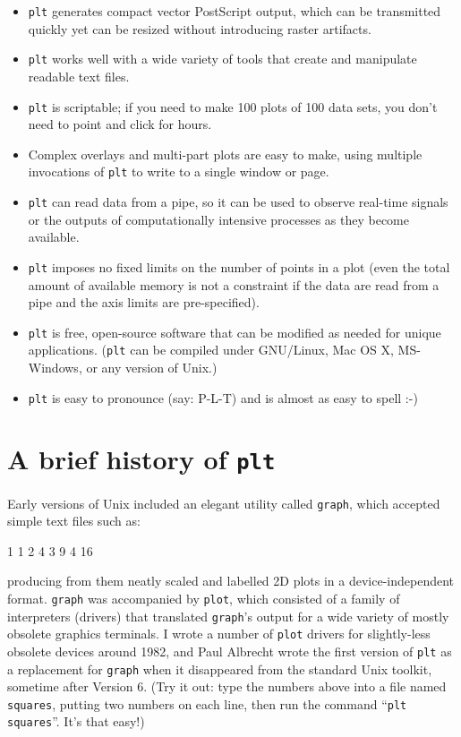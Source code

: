 \documentclass{book}
\begin{document}
\begin{itemize}
\item
{\tt plt} generates compact vector PostScript output, which can be transmitted
quickly yet can be resized without introducing raster artifacts.

\item
{\tt plt} works well with a wide variety of tools that create and
manipulate readable text files.

\item
{\tt plt} is scriptable;  if you need to make 100 plots of 100 data sets,
you don't need to point and click for hours.

\item
Complex overlays and multi-part plots are easy to make, using multiple
invocations of {\tt plt} to write to a single window or page.

\item
{\tt plt} can read data from a pipe, so it can be used to observe real-time
signals or the outputs of computationally intensive processes as they become
available.

\item
{\tt plt} imposes no fixed limits on the number of points in a plot (even
the total amount of available memory is not a constraint if the data are
read from a pipe and the axis limits are pre-specified).

\item
{\tt plt} is free, open-source software that can be modified as needed for
unique applications.  ({\tt plt} can be compiled under GNU/Linux,
Mac OS X, MS-Windows, or any version of Unix.)

\item
{\tt plt} is easy to pronounce (say: P-L-T) and is almost as easy to spell :-)
\end{itemize}

\section{A brief history of {\tt plt}}

%
%
%
%
Early versions of Unix included an elegant utility called {\tt graph}, which
accepted simple text files such as:
\begin{center}
\begin{boxedverbatim}
1 1
2 4
3 9
4 16
\end{boxedverbatim}
\end{center}
\noindent
producing from them neatly scaled and labelled 2D plots in a device-independent
format.  {\tt graph} was accompanied by {\tt plot}, which consisted of a family
of interpreters (drivers) that translated {\tt graph}'s output for a wide
variety of mostly obsolete graphics terminals.  I wrote a number of {\tt plot}
drivers for slightly-less obsolete devices around 1982, and Paul Albrecht wrote
the first version of {\tt plt} as a replacement for {\tt graph} when it
disappeared from the standard Unix toolkit, sometime after Version 6.  (Try
it out: type the numbers above into a file named {\tt squares}, putting two
numbers on each line, then run the command ``{\tt plt squares}''.  It's that
easy!)
\end{document}

